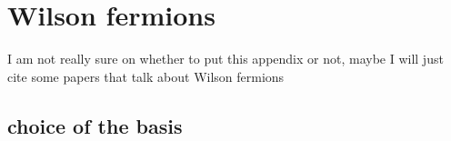 \chapter{Wilson fermions}
\label{AppendixB}
I am not really sure on whether to put this appendix or not, maybe I will just cite some papers that talk about Wilson fermions
\section*{choice of the basis}